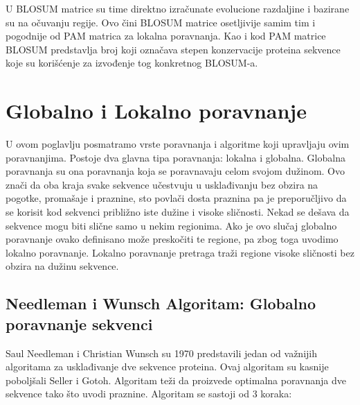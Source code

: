 U BLOSUM matrice su time direktno izračunate evolucione razdaljine i bazirane su na očuvanju regije. Ovo čini BLOSUM matrice osetljivije samim tim i pogodnije od PAM matrica za lokalna poravnanja. Kao i kod PAM matrice BLOSUM predstavlja broj koji označava stepen konzervacije proteina sekvence koje su korišćenje za izvođenje tog konkretnog BLOSUM-a.


\section{Globalno i Lokalno poravnanje}
U ovom poglavlju posmatramo vrste poravnanja i algoritme koji upravljaju ovim poravnanjima. Postoje dva glavna tipa poravnanja: lokalna i globalna. Globalna poravnanja su ona poravnanja koja se poravnavaju celom svojom dužinom. Ovo znači da oba kraja svake sekvence učestvuju u usklađivanju bez obzira na pogotke, promašaje i praznine, sto povlači dosta praznina pa je preporučljivo da se korisit kod sekvenci približno iste dužine i visoke sličnosti. Nekad se dešava da sekvence mogu biti slične samo u nekim regionima. Ako je ovo slučaj globalno poravnanje ovako definisano može preskočiti te regione, pa zbog toga uvodimo lokalno poravnanje. Lokalno poravnanje pretraga traži regione visoke sličnosti bez obzira na dužinu sekvence.


\subsection{Needleman i Wunsch Algoritam: Globalno poravnanje sekvenci}
Saul Needleman i Christian Wunsch su 1970 predstavili jedan od važnijih algoritama za usklađivanje dve sekvence proteina. Ovaj algoritam su kasnije poboljšali Seller i Gotoh. Algoritam teži da proizvede optimalna poravnanja dve sekvence tako što uvodi praznine. Algoritam se sastoji od 3 koraka: 

